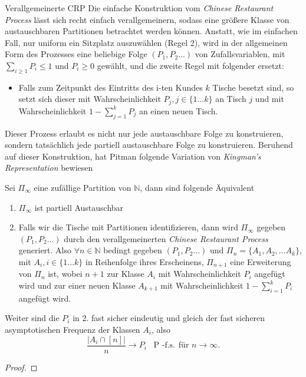 \begin{section}{Verallgemeinerte CRP}
Die einfache Konstruktion vom \textit{Chinese Restaurant Process} lässt sich recht einfach verallgemeinern, sodass eine größere Klasse von austauschbaren Partitionen betrachtet werden können. Anstatt, wie im einfachen Fall, nur uniform ein Sitzplatz auszuwählen (Regel 2), wird in der allgemeinen Form des Prozesses eine beliebige Folge $(P_1,P_2...)$ von Zufallsvariablen, mit $\sum_{i\geq1}P_i \leq 1$ und $P_i \geq 0$ gewählt, und die zweite Regel mit folgender ersetzt:
\begin{itemize} 
    \item Falls zum Zeitpunkt des Eintritts des i-ten Kundes $k$ Tische besetzt sind, so setzt sich dieser mit Wahrscheinlichkeit $P_j, j \in \{1...k\}$ an Tisch $j$ und mit Wahrscheinlichkeit $1 - \sum_{j=1}^{k}P_j$ an einen neuen Tisch.
\end{itemize}
Dieser Prozess erlaubt es nicht nur jede austauschbare Folge zu konstruieren, sondern tatsächlich jede partiell austauschbare Folge zu konstruieren. Beruhend auf dieser Konstruktion, hat Pitman \cite{pitman1995exchangeable} folgende Variation von \textit{Kingman's Representation} bewiesen
\begin{theorem}
    \label{pitman}
    Sei $\Pi_\infty$ eine zufällige Partition von $\mathbb{N}$, dann sind folgende Äquivalent
    \begin{enumerate}
        \item $\Pi_\infty$ ist partiell Austauschbar
        \item Falls wir die Tische mit Partitionen identifizieren, dann wird $\Pi_\infty$ gegeben $(P_1,P_2...)$ durch den verallgemeinerten \textit{Chinese Restaurant Process} generiert. Also $\forall{n} \in \mathbb{N}$ bedingt gegeben $(P_1,P_2...)$ und $\Pi_n = \{A_1,A_2,...A_k\}$, mit $A_i, i \in \{1...k\}$ in Reihenfolge ihres Erscheinens, $\Pi_{n+1}$ eine Erweiterung von $\Pi_n$ ist, wobei $n+1$ zur Klasse $A_i$ mit Wahrscheinlichkeit $P_i$ angefügt wird und zur einer neuen Klasse $A_{k+1}$ mit Wahrscheinlichkeit $1 - \sum_{i=1}^{k}P_i$ angefügt wird. 
    \end{enumerate}
Weiter sind die $P_i$ in 2. fast sicher eindeutig und gleich der fast sicheren asymptotischen Frequenz der Klassen $A_i$, also
\[ 
\frac{|A_i \cap [n]|}{n} \to P_i \hspace{10pt} \text{P -f.s.} \hspace{5pt} \text{für } n \to \infty.
\]
\end{theorem}
\begin{proof}

\end{proof}
\end{section}

